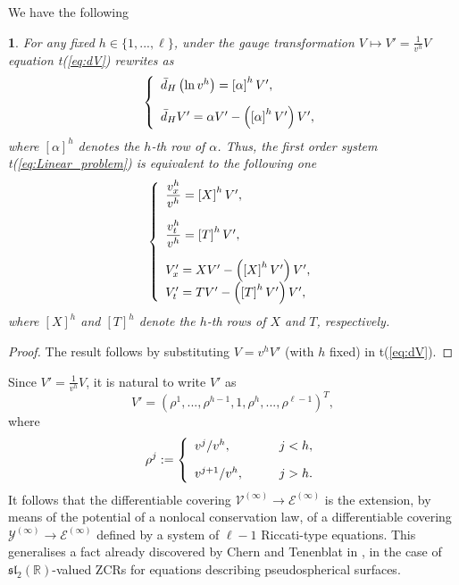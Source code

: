 \documentclass[12pt,english]{elsarticle}
\theoremstyle{plain}
\theoremstyle{plain}
\theoremstyle{remark}
\theoremstyle{plain}
\newtheorem{lem}[thm]{\protect\lemmaname}
\theoremstyle{definition}
\theoremstyle{definition}
\providecommand{\lemmaname}{Lemma}
\begin{document}
We have the following
%
\begin{lem}
\label{lem22}%
For any fixed $h\in \{1,...,\ell \}$, under the gauge transformation
$V\mapsto V'=\frac{1}{v^{h}}V$ equation t{(\ref{eq:dV})} rewrites as
%
\begin{equation}
\left \{
%
\begin{array}{l}
\bar{d}_{H}\left (\ln v^{h}\right )=\left [\alpha \right ]^{h}V_{}',
\vspace{10pt}
\\
\bar{d}_{H}V'=\alpha V'-\left (\left [\alpha \right ]^{h}V'\right )V',
\end{array}
%
\right .
\label{eq:Lema22-1}
\end{equation}
%
where $\left [\alpha \right ]^{h}$ denotes the $h$-th row of
$\alpha $. Thus, the first order system t{(\ref{eq:Linear_problem})} is equivalent
to the following one
%
\begin{equation}
\left \{
%
\begin{array}{l}
{\displaystyle \frac{v_{x}^{h}}{v^{h}}}=\left [X\right ]^{h}V',
\vspace{10pt}
\\
{\displaystyle \frac{v_{t}^{h}}{v^{h}}}=\left [T\right ]^{h}V',
\vspace{10pt}
\\
V'_{x}=XV_{}'-\left (\left [X\right ]^{h}V'\right )V',
\\
V'_{t}=TV'-\left (\left [T\right ]^{h}V'\right )V',
\end{array}
%
\right .
\label{eq:Lema22-2}
\end{equation}
%
where $\left [X\right ]^{h}$ and $\left [T\right ]^{h}$ denote the
$h$-th rows of $X$ and $T$, respectively.
\end{lem}

\begin{proof}
The result follows by substituting $V=v^{h}V'$ (with $h$ fixed) in t{(\ref{eq:dV})}.
\end{proof}
%
  Since $V'=\frac{1}{v^{h}}V$, it is natural to write $V'$ as
%
\begin{equation*}
V'=(\rho ^{1},...,\rho ^{h-1},1,\rho ^{h},...,\rho ^{\ell -1})^{T},
\end{equation*}
%
where
%
\begin{equation*}
\rho ^{j}:=\left \{
%
\begin{array}{l@{\quad}l}
v^{j}/v^{h},\qquad & j<h,
\vspace{10pt}
\\
v^{j+1}/v^{h},\qquad & j>h.
\end{array}
%
\right .
\end{equation*}
%
It follows that the differentiable covering
$\mathcal{V}^{(\infty )}\rightarrow \mathcal{E}^{(\infty )}$ is the extension,
by means of the potential of a nonlocal conservation law, of a differentiable
covering
$\mathcal{Y}^{(\infty )}\rightarrow \mathcal{E}^{(\infty )}$ defined by
a system of $\ell -1$ Riccati-type equations. This generalises a fact already
discovered by Chern and Tenenblat in \cite{CT}, in the case of
$\mathfrak{sl}_{2}(\mathbb{R})$-valued ZCRs for equations describing pseudospherical
surfaces.
\end{document}
